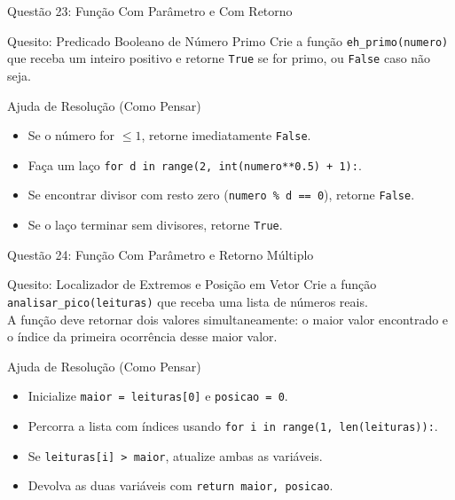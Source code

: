 \begin{frame}{Questão 23: Função Com Parâmetro e Com Retorno}
    \begin{block}{Quesito: Predicado Booleano de Número Primo}
        Crie a função \texttt{eh\_primo(numero)} que receba um inteiro positivo e retorne \texttt{True} se for primo, ou \texttt{False} caso não seja.
    \end{block}

    \begin{exampleblock}{Ajuda de Resolução (Como Pensar)}
        \begin{itemize}
            \item Se o número for $\le 1$, retorne imediatamente \texttt{False}.
            \item Faça um laço \texttt{for d in range(2, int(numero**0.5) + 1):}.
            \item Se encontrar divisor com resto zero (\texttt{numero \% d == 0}), retorne \texttt{False}.
            \item Se o laço terminar sem divisores, retorne \texttt{True}.
        \end{itemize}
    \end{exampleblock}
\end{frame}

\begin{frame}{Questão 24: Função Com Parâmetro e Retorno Múltiplo}
    \begin{block}{Quesito: Localizador de Extremos e Posição em Vetor}
        Crie a função \texttt{analisar\_pico(leituras)} que receba uma lista de números reais. \\
        A função deve retornar dois valores simultaneamente: o maior valor encontrado e o índice da primeira ocorrência desse maior valor.
    \end{block}

    \begin{exampleblock}{Ajuda de Resolução (Como Pensar)}
        \begin{itemize}
            \item Inicialize \texttt{maior = leituras[0]} e \texttt{posicao = 0}.
            \item Percorra a lista com índices usando \texttt{for i in range(1, len(leituras)):}.
            \item Se \texttt{leituras[i] > maior}, atualize ambas as variáveis.
            \item Devolva as duas variáveis com \texttt{return maior, posicao}.
        \end{itemize}
    \end{exampleblock}
\end{frame}

